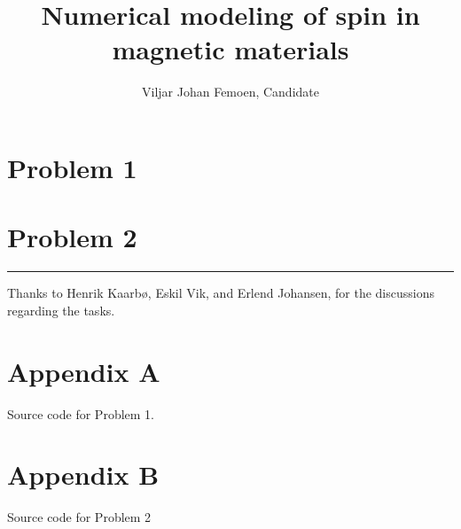 \documentclass{labreport}
\title{Numerical modeling of spin in magnetic materials}
\author{Viljar Johan Femoen, Candidate \candnum}
\begin{document}
\maketitle

\section{Problem 1}


\section{Problem 2}









\begin{center}
    \rule{2cm}{.4pt}
\end{center}
Thanks to Henrik Kaarbø, Eskil Vik, and Erlend Johansen,
for the discussions regarding the tasks.

\onecolumn
\section{Appendix A}
Source code for Problem 1.
\href{
    https://www.github.com/viljarjf/nano/tree/main/TFY4235_numfys/2
    }{\color{blue}{The GitHub source can be found here}}



\newpage
\section{Appendix B}
Source code for Problem 2
\href{
    https://www.github.com/viljarjf/nano/tree/main/TFY4235_numfys/exam
    }{\color{blue}{The GitHub source can be found here}}



\makeatletter
{}
\makeatother
\nocite{*}
\printbibliography
\end{document}
